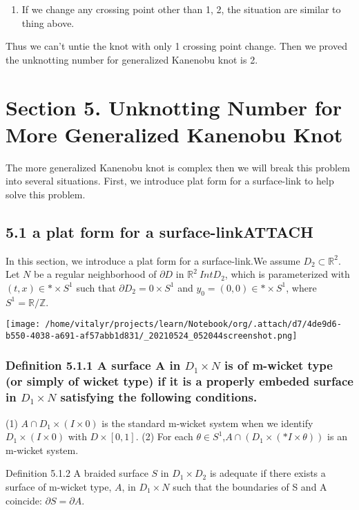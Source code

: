 \documentclass[a4paper]{article}
\begin{document}
\begin{enumerate}
\item If we change any crossing point other than 1, 2, the situation are similar to thing above.
\end{enumerate}

Thus we can't untie the knot with only 1 crossing point change. Then we proved the unknotting number for generalized Kanenobu knot is 2.
\section{Section 5. Unknotting Number for More Generalized Kanenobu Knot}
\label{sec:org8269e40}
The more generalized Kanenobu knot is complex then we will break this problem into several situations.
First, we introduce plat form for a surface-link to help solve this problem.
\subsection{5.1 a plat form for a surface-link\hfill{}\textsc{ATTACH}}
\label{sec:org238c3e9}
In this section, we introduce a plat form for a surface-link.We assume \(D_{2}\subset \mathbb{R}^{2}\). Let \(N\) be a regular neighborhood of \(\partial D\) in \(\mathbb{R}^{2}\ Int D_{2}\), which is parameterized with \((t, x) \in * \times S^{1}\) such that \(\partial D_{2} ={0} \times S^{1}\) and \(y_{0}=(0,0) \in * \times S^{1}\), where \(S^{1} =\mathbb{R}/\mathbb{Z}\).

\begin{center}
\texttt{[image: /home/vitalyr/projects/learn/Notebook/org/.attach/d7/4de9d6-b550-4038-a691-af57abb1d831/\_20210524\_052044screenshot.png]}
\end{center}
\subsubsection{Definition 5.1.1 A surface A in \(D_{1} \times N\) is of m-wicket type (or simply of wicket type) if it is a properly embeded surface in \(D_{1} \times N\) satisfying the following conditions.}
\label{sec:org49facd5}
(1) \(A \cap D_{1} \times (I \times {0})\) is the standard m-wicket system when we identify \(D_{1} \times (I \times {0})\) with \(D \times [0,1]\).
(2) For each \(\theta \in S^{1}\),\(A \cap (D_{1}\times (*I \times {\theta}))\) is an m-wicket system.

Definition 5.1.2 A braided surface \(S\) in \(D_{1} \times D_{2}\) is adequate if there exists a surface of m-wicket type, \(A\), in \(D_{1} \times N\) such that the boundaries of S and A coincide: \(\partial S = \partial A\).
\end{document}
